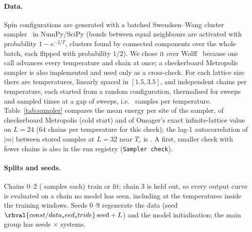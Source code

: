 \paragraph*{Data.} Spin configurations are generated with a batched Swendsen--Wang cluster sampler~\cite{swendsen1987nonuniversal} in NumPy/SciPy (bonds between equal neighbours are activated with probability $1-e^{-2/T}$, clusters found by connected components over the whole batch, each flipped with probability $1/2$). We chose it over Wolff~\cite{wolff1989collective} because one call advances every temperature and chain at once; a checkerboard Metropolis sampler is also implemented and used only as a cross-check. For each lattice size there are  temperatures, linearly spaced in $[1.5,3.5]$, and  independent chains per temperature, each started from a random configuration, thermalised for  sweeps and sampled  times at a gap of  sweeps, i.e.\  samples per temperature. Table~\ref{tab:sampler} compares the mean energy per site of the sampler, of checkerboard Metropolis (cold start) and of Onsager's exact infinite-lattice value on $L=24$ ($64$ chains per temperature for this check); the lag-1 autocorrelation of $|m|$ between stored samples at $L=32$ near $T_c$ is . A first, smaller check with fewer chains is also in the run registry (\texttt{Sampler check}).

\begin{table}[t]\centering\caption{Sampler check, $L=24$: energy per site from Swendsen--Wang, checkerboard Metropolis, and the exact infinite-lattice value (finite-size and statistical differences are of order $10^{-3}$).}\label{tab:sampler}

\end{table}

\paragraph*{Splits and seeds.} Chains 0--2 ( samples each) train or fit; chain 3 is held out, so every output curve is evaluated on a chain no model has seen, including at the temperatures inside the training windows. Seeds $0$--$9$ regenerate the data (seed $\rhval{const/data_seed_stride}\,\mathrm{seed}+L$) and the model initialisation; the main group has  seeds $\times$  systems.


